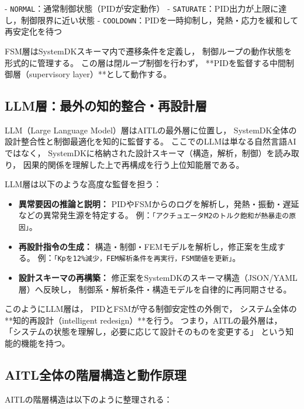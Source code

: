 - \texttt{NORMAL}：通常制御状態（PIDが安定動作）  
- \texttt{SATURATE}：PID出力が上限に達し，制御限界に近い状態  
- \texttt{COOLDOWN}：PIDを一時抑制し，発熱・応力を緩和して再安定化を待つ  

FSM層はSystemDKスキーマ内で遷移条件を定義し，
制御ループの動作状態を形式的に管理する。
この層は閉ループ制御を行わず，
**PIDを監督する中間制御層（supervisory layer）**として動作する。

\subsection{LLM層：最外の知的整合・再設計層}
LLM（Large Language Model）層はAITLの最外層に位置し，
SystemDK全体の設計整合性と制御最適化を知的に監督する。
ここでのLLMは単なる自然言語AIではなく，
SystemDKに格納された設計スキーマ（構造，解析，制御）を読み取り，
因果的関係を理解した上で再構成を行う上位知能層である。

LLM層は以下のような高度な監督を担う：

\begin{itemize}
  \item \textbf{異常要因の推論と説明：}  
  PIDやFSMからのログを解析し，発熱・振動・遅延などの異常発生源を特定する。  
  例：\texttt{「アクチュエータM2のトルク飽和が熱暴走の原因」}。

  \item \textbf{再設計指令の生成：}  
  構造・制御・FEMモデルを解析し，修正案を生成する。  
  例：\texttt{「Kpを12\%減少，FEM解析条件を再実行，FSM閾値を更新」}。

  \item \textbf{設計スキーマの再構築：}  
  修正案をSystemDKのスキーマ構造（JSON/YAML層）へ反映し，
  制御系・解析条件・構造モデルを自律的に再同期させる。
\end{itemize}

このようにLLM層は，
PIDとFSMが守る制御安定性の外側で，
システム全体の**知的再設計（intelligent redesign）**を行う。
つまり，AITLの最外層は，
「システムの状態を理解し，必要に応じて設計そのものを変更する」
という知能的機能を持つ。

\subsection{AITL全体の階層構造と動作原理}

AITLの階層構造は以下のように整理される：

